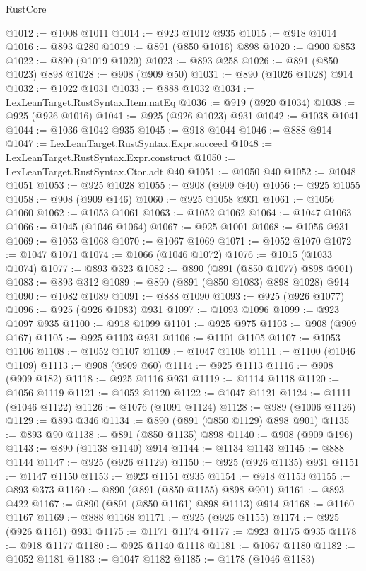 \begin{lexlean}{RustCore}
\begin{coremodule}
@1012 := @1008 @1011
@1014 := @923 @1012 @935
@1015 := @918 @1014
@1016 := @893 @280
@1019 := @891 (@850 @1016) @898
@1020 := @900 @853
@1022 := @890 (@1019 @1020)
@1023 := @893 @258
@1026 := @891 (@850 @1023) @898
@1028 := @908 (@909 @50)
@1031 := @890 (@1026 @1028) @914
@1032 := @1022 @1031
@1033 := @888 @1032
@1034 := LexLeanTarget.RustSyntax.Item.natEq
@1036 := @919 (@920 @1034)
@1038 := @925 (@926 @1016)
@1041 := @925 (@926 @1023) @931
@1042 := @1038 @1041
@1044 := @1036 @1042 @935
@1045 := @918 @1044
@1046 := @888 @914
@1047 := LexLeanTarget.RustSyntax.Expr.succeed
@1048 := LexLeanTarget.RustSyntax.Expr.construct
@1050 := LexLeanTarget.RustSyntax.Ctor.adt @40
@1051 := @1050 @40
@1052 := @1048 @1051
@1053 := @925 @1028
@1055 := @908 (@909 @40)
@1056 := @925 @1055
@1058 := @908 (@909 @146)
@1060 := @925 @1058 @931
@1061 := @1056 @1060
@1062 := @1053 @1061
@1063 := @1052 @1062
@1064 := @1047 @1063
@1066 := @1045 (@1046 @1064)
@1067 := @925 @1001
@1068 := @1056 @931
@1069 := @1053 @1068
@1070 := @1067 @1069
@1071 := @1052 @1070
@1072 := @1047 @1071
@1074 := @1066 (@1046 @1072)
@1076 := @1015 (@1033 @1074)
@1077 := @893 @323
@1082 := @890 (@891 (@850 @1077) @898 @901)
@1083 := @893 @312
@1089 := @890 (@891 (@850 @1083) @898 @1028) @914
@1090 := @1082 @1089
@1091 := @888 @1090
@1093 := @925 (@926 @1077)
@1096 := @925 (@926 @1083) @931
@1097 := @1093 @1096
@1099 := @923 @1097 @935
@1100 := @918 @1099
@1101 := @925 @975
@1103 := @908 (@909 @167)
@1105 := @925 @1103 @931
@1106 := @1101 @1105
@1107 := @1053 @1106
@1108 := @1052 @1107
@1109 := @1047 @1108
@1111 := @1100 (@1046 @1109)
@1113 := @908 (@909 @60)
@1114 := @925 @1113
@1116 := @908 (@909 @182)
@1118 := @925 @1116 @931
@1119 := @1114 @1118
@1120 := @1056 @1119
@1121 := @1052 @1120
@1122 := @1047 @1121
@1124 := @1111 (@1046 @1122)
@1126 := @1076 (@1091 @1124)
@1128 := @989 (@1006 @1126)
@1129 := @893 @346
@1134 := @890 (@891 (@850 @1129) @898 @901)
@1135 := @893 @90
@1138 := @891 (@850 @1135) @898
@1140 := @908 (@909 @196)
@1143 := @890 (@1138 @1140) @914
@1144 := @1134 @1143
@1145 := @888 @1144
@1147 := @925 (@926 @1129)
@1150 := @925 (@926 @1135) @931
@1151 := @1147 @1150
@1153 := @923 @1151 @935
@1154 := @918 @1153
@1155 := @893 @373
@1160 := @890 (@891 (@850 @1155) @898 @901)
@1161 := @893 @422
@1167 := @890 (@891 (@850 @1161) @898 @1113) @914
@1168 := @1160 @1167
@1169 := @888 @1168
@1171 := @925 (@926 @1155)
@1174 := @925 (@926 @1161) @931
@1175 := @1171 @1174
@1177 := @923 @1175 @935
@1178 := @918 @1177
@1180 := @925 @1140 @1118
@1181 := @1067 @1180
@1182 := @1052 @1181
@1183 := @1047 @1182
@1185 := @1178 (@1046 @1183)

\end{coremodule}
\end{lexlean}
